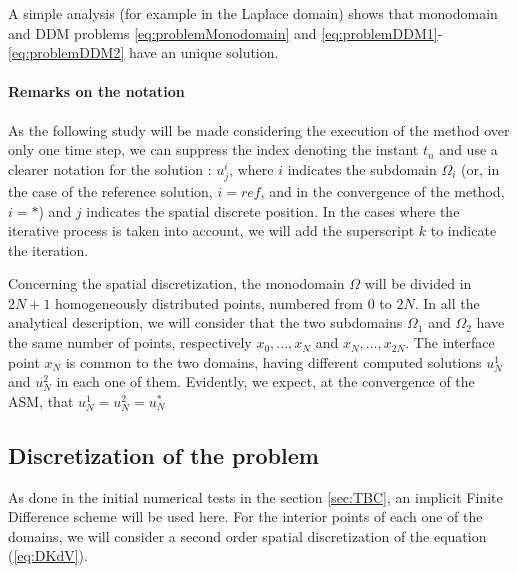 \indent A simple analysis (for example in the Laplace domain) shows that monodomain and DDM problems \eqref{eq:problemMonodomain} and \eqref{eq:problemDDM1}-\eqref{eq:problemDDM2} have an unique solution.

\paragraph{Remarks on the notation}


\indent As the following study will be made considering the execution of the method over only one time step, we can suppress the index denoting the instant $t_n$ and use a clearer notation for the solution : $u_j^i$, where $i$ indicates the subdomain $\Omega_i$ (or, in the case of the reference solution, $i = ref$, and in the convergence of the method, $i = *$) and $j$ indicates the spatial discrete position. In the cases where the iterative process is taken into account, we will add the superscript $k$ to indicate the iteration.

\indent Concerning the spatial discretization, the monodomain $\Omega$ will be divided in $2N + 1$ homogeneously distributed points, numbered from $0$ to $2N$. In all the analytical description, we will consider that the two subdomains $\Omega_1$ and $\Omega_2$ have the same number of points, respectively $x_0,...,x_N$ and $x_N,...,x_{2N}$. The interface point $x_N$ is common to the two domains, having different computed solutions $u_N^1$ and $u_N^2$ in each one of them. Evidently, we expect, at the convergence of the ASM, that $u_N^1 = u_N^2 = u_N^*$

\subsection{Discretization of the problem}

\indent As done in the initial numerical tests in the section \ref{sec:TBC}, an implicit Finite Difference scheme will be used here. For the interior points of each one of the domains, we will consider a second order spatial discretization of the equation (\ref{eq:DKdV}).


